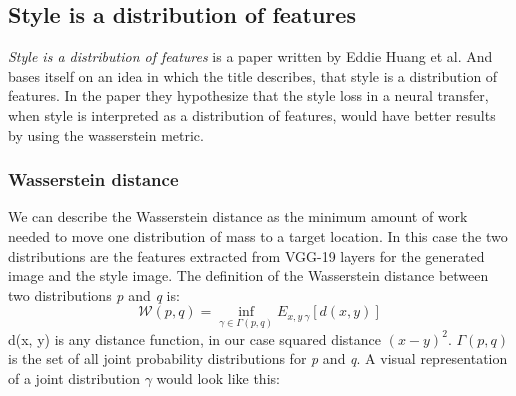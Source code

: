 \subsection{Style is a distribution of features}
\label{sec:Style is a distribution of features}
\textit{Style is a distribution of features} is a paper written by Eddie Huang et al. \cite{Huang:2} And bases itself on an idea in which the title describes, that style is a distribution of features. In the paper they hypothesize that the style loss in a neural transfer, when style is interpreted as a distribution of features,  would have better results by using the wasserstein metric.
\subsubsection{Wasserstein distance}
We can describe the Wasserstein distance as the minimum amount of work needed to move one distribution of mass to a target location. In this case the two distributions are the features extracted from VGG-19 layers for the generated image and the style image.\newline
The definition of the Wasserstein distance between two distributions \textit{p} and \textit{q} is: \newline
\begin{equation}
\mathcal{W}(p, q) = \inf_{\gamma \in \Gamma(p, q)} E_{x, y~\gamma}[d(x, y)]
\end{equation}
\newline
d(x, y) is any distance function, in our case squared distance $(x - y)^2$. $\Gamma(p, q)$ is the set of all joint probability distributions for \textit{p} and \textit{q}. A visual representation of a joint distribution $\gamma$ would look like this:\newline
